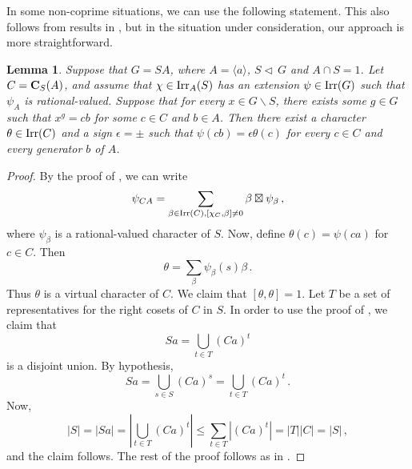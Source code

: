 \documentclass[11pt]{amsart}
\theoremstyle{plain}
\newtheorem{lem}[thm]{Lemma}
\theoremstyle{definition}
\numberwithin{thm}{section}
\numberwithin{equation}{thm}
\newcommand{\Aut}{\mathrm{Aut}}
\def\irr#1{{\rm Irr}(#1)}
\def\cent#1#2{{\bf C}_{#1}(#2)}
\def\nor{\triangleleft\,}
\newcommand{\Q}{{\mathbb Q}}
\newcommand{\0}{\emptyset}
\newcommand{\tw}[1]{{}^#1\!}
\begin{document}
In some non-coprime situations, we can use the following statement. This also follows from results in \cite[\S9]{Da}, but in the situation under consideration, our approach is more straightforward.  

\begin{lem}\label{coprime3}
Suppose that $G=SA$, where $A=\langle a\rangle$,  $S\nor G$ and $A\cap S=1$.
Let $C=\cent SA$, and assume that $\chi \in {\rm Irr}_A(S)$ has an extension 
$\psi \in \irr G$ such that $\psi_A$ is rational-valued. 
Suppose that for every $x \in G \smallsetminus S$, there exists some  $g \in G$ such that $x^g=cb$ for some $c \in C$ and $b \in A$. Then there exist a character $\theta \in \irr C$ and a sign $\epsilon = \pm$
such that $\psi(cb)=\epsilon \theta(c)$ for every $c \in C$ and every generator 
$b$ of $A$. 
\end{lem}

\begin{proof}
By the proof of \cite[Lemma 13.5]{Is}, we can write
$$\psi_{CA}=\sum_{\beta \in \irr C, [\chi_C, \beta] \ne 0} \beta \boxtimes \psi_\beta \, ,$$
where $\psi_\beta$ is a rational-valued character of $S$.
Now, define $\theta(c)=\psi(ca)$ for $c \in C$.
Then
$$\theta=\sum_\beta \psi_\beta(s) \beta \, .$$
Thus $\theta$ is a virtual character of $C$. We claim that $[\theta,\theta]=1$. 
Let $T$ be a set of representatives for the right cosets of $C$ in $S$.
In order to use the proof of \cite[Theorem 13.6]{Is}, we claim that
$$Sa=\bigcup_{t \in T} (Ca)^t$$
is a disjoint union. By hypothesis, %
$$Sa=\bigcup_{s \in S} (Ca)^s=\bigcup_{t \in T} (Ca)^t \, .$$
Now,
$$|S|=|Sa|=|\bigcup_{t \in T} (Ca)^t|\le \sum_{t \in T} |(Ca)^t|=
|T||C|=|S| \, ,$$ and the claim follows. The rest of the proof follows as 
in \cite[Theorem 13.6]{Is}.
\end{proof}

 
\end{document}
